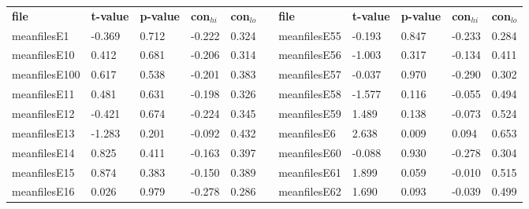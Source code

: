 \begin{table}[h!]
\small
\begin{tabular}{lllllllllll}
\textbf{file} & \textbf{t-value} & \textbf{p-value} & \textbf{con$_{hi}$} & \textbf{con$_{lo}$} & \textbf{} & \textbf{file} & \textbf{t-value} & \textbf{p-value} & \textbf{con$_{hi}$} & \textbf{con$_{lo}$} \\ \cline{1-5} \cline{7-11} 
meanfilesE1   & -0.369           & 0.712            & -0.222              & 0.324               &           & meanfilesE55  & -0.193           & 0.847            & -0.233              & 0.284               \\
meanfilesE10  & 0.412            & 0.681            & -0.206              & 0.314               &           & meanfilesE56  & -1.003           & 0.317            & -0.134              & 0.411               \\
meanfilesE100 & 0.617            & 0.538            & -0.201              & 0.383               &           & meanfilesE57  & -0.037           & 0.970            & -0.290              & 0.302               \\
meanfilesE11  & 0.481            & 0.631            & -0.198              & 0.326               &           & meanfilesE58  & -1.577           & 0.116            & -0.055              & 0.494               \\
meanfilesE12  & -0.421           & 0.674            & -0.224              & 0.345               &           & meanfilesE59  & 1.489            & 0.138            & -0.073              & 0.524               \\
meanfilesE13  & -1.283           & 0.201            & -0.092              & 0.432               &           & meanfilesE6   & 2.638            & 0.009            & 0.094               & 0.653               \\
meanfilesE14  & 0.825            & 0.411            & -0.163              & 0.397               &           & meanfilesE60  & -0.088           & 0.930            & -0.278              & 0.304               \\
meanfilesE15  & 0.874            & 0.383            & -0.150              & 0.389               &           & meanfilesE61  & 1.899            & 0.059            & -0.010              & 0.515               \\
meanfilesE16  & 0.026            & 0.979            & -0.278              & 0.286               &           & meanfilesE62  & 1.690            & 0.093            & -0.039              & 0.499               \\

\end{tabular}
\end{table}
